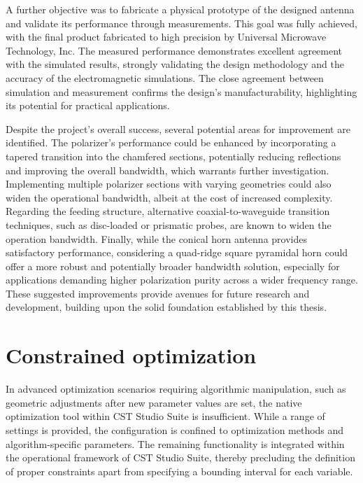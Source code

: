 \documentclass[11pt,a4paper,twoside,openany]{report}
\begin{document}
A further objective was to fabricate a physical prototype of the designed antenna and validate its performance through measurements. This goal was fully achieved, with the final product fabricated to high precision by Universal Microwave Technology, Inc. The measured performance demonstrates excellent agreement with the simulated results, strongly validating the design methodology and the accuracy of the electromagnetic simulations. The close agreement between simulation and measurement confirms the design's manufacturability, highlighting its potential for practical applications.

Despite the project's overall success, several potential areas for improvement are identified. The polarizer's performance could be enhanced by incorporating a tapered transition into the chamfered sections, potentially reducing reflections and improving the overall bandwidth, which warrants further investigation. Implementing multiple polarizer sections with varying geometries could also widen the operational bandwidth, albeit at the cost of increased complexity. Regarding the feeding structure, alternative coaxial-to-waveguide transition techniques, such as disc-loaded or prismatic probes, are known to widen the operation bandwidth. Finally, while the conical horn antenna provides satisfactory performance, considering a quad-ridge square pyramidal horn could offer a more robust and potentially broader bandwidth solution, especially for applications demanding higher polarization purity across a wider frequency range. These suggested improvements provide avenues for future research and development, building upon the solid foundation established by this thesis.

\appendix
\chapter{Constrained optimization}
\label{appendix:constrained-optimization}
In advanced optimization scenarios requiring algorithmic manipulation, such as geometric adjustments after new parameter values are set, the native optimization tool within CST Studio Suite is insufficient. While a range of settings is provided, the configuration is confined to optimization methods and algorithm-specific parameters. The remaining functionality is integrated within the operational framework of CST Studio Suite, thereby precluding the definition of proper constraints apart from specifying a bounding interval for each variable.
\end{document}
